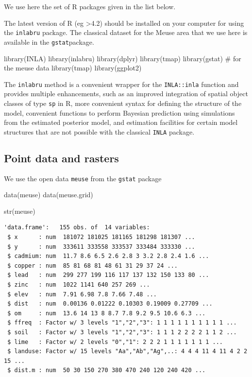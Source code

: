 \documentclass[
  a4paper,
]{article}
\newenvironment{Shaded}{\begin{snugshade}}{\end{snugshade}}
\newcommand{\CommentTok}[1]{\textcolor[rgb]{0.37,0.37,0.37}{#1}}
\newcommand{\FunctionTok}[1]{\textcolor[rgb]{0.28,0.35,0.67}{#1}}
\newcommand{\NormalTok}[1]{\textcolor[rgb]{0.00,0.23,0.31}{#1}}
\begin{document}
We use here the set of R packages given in the list below.

The latest version of R (eg \textgreater4.2) should be installed on your
computer for using the \texttt{inlabru} package. The classical dataset
for the Meuse area that we use here is available in the
\texttt{gstat}package.

\begin{Shaded}
\begin{Highlighting}[]
\FunctionTok{library}\NormalTok{(INLA)}
\FunctionTok{library}\NormalTok{(inlabru)}
\FunctionTok{library}\NormalTok{(dplyr)}
\FunctionTok{library}\NormalTok{(tmap)}
\FunctionTok{library}\NormalTok{(gstat) }\CommentTok{\# for the meuse data}
\FunctionTok{library}\NormalTok{(tmap)}
\FunctionTok{library}\NormalTok{(ggplot2)}
\end{Highlighting}
\end{Shaded}

The \texttt{inlabru} method is a convenient wrapper for the
\texttt{INLA::inla} function and provides multiple enhancements, such as
an improved integration of spatial object classes of type \texttt{sp} in
R, more convenient syntax for defining the structure of the model,
convenient functions to perform Bayesian prediction using simulations
from the estimated posterior model, and estimation facilities for
certain model structures that are not possible with the classical
\texttt{INLA} package.

\hypertarget{point-data-and-rasters}{%
\subsection{Point data and rasters}\label{point-data-and-rasters}}

We use the open data \texttt{meuse} from the \texttt{gstat} package

\begin{Shaded}
\begin{Highlighting}[]
\FunctionTok{data}\NormalTok{(meuse)}
\FunctionTok{data}\NormalTok{(meuse.grid)}

\FunctionTok{str}\NormalTok{(meuse)}
\end{Highlighting}
\end{Shaded}

\begin{verbatim}
'data.frame':   155 obs. of  14 variables:
 $ x      : num  181072 181025 181165 181298 181307 ...
 $ y      : num  333611 333558 333537 333484 333330 ...
 $ cadmium: num  11.7 8.6 6.5 2.6 2.8 3 3.2 2.8 2.4 1.6 ...
 $ copper : num  85 81 68 81 48 61 31 29 37 24 ...
 $ lead   : num  299 277 199 116 117 137 132 150 133 80 ...
 $ zinc   : num  1022 1141 640 257 269 ...
 $ elev   : num  7.91 6.98 7.8 7.66 7.48 ...
 $ dist   : num  0.00136 0.01222 0.10303 0.19009 0.27709 ...
 $ om     : num  13.6 14 13 8 8.7 7.8 9.2 9.5 10.6 6.3 ...
 $ ffreq  : Factor w/ 3 levels "1","2","3": 1 1 1 1 1 1 1 1 1 1 ...
 $ soil   : Factor w/ 3 levels "1","2","3": 1 1 1 2 2 2 2 1 1 2 ...
 $ lime   : Factor w/ 2 levels "0","1": 2 2 2 1 1 1 1 1 1 1 ...
 $ landuse: Factor w/ 15 levels "Aa","Ab","Ag",..: 4 4 4 11 4 11 4 2 2 15 ...
 $ dist.m : num  50 30 150 270 380 470 240 120 240 420 ...
\end{verbatim}
\end{document}
